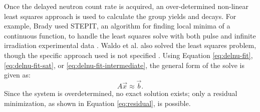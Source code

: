 



Once the delayed neutron count rate is acquired, an over-determined non-linear least squares approach is used to calculate the group yields and decays.
For example, Brady used STEPIT, an algorithm for finding local minima of a continuous function, to handle the least squares solve with both pulse and infinite irradiation experimental data \cite{brady1988evaluation, chandler1969stepit}.
Waldo et al. also solved the least squares problem, though the specific approach used is not specified \cite{waldo1981delayed}.
Using Equation \eqref{eq:delnu-fit}, \eqref{eq:delnu-fit-sat}, or \eqref{eq:delnu-fit-intermediate}, the general form of the solve is given as:
\begin{equation}
A \vec{x} \approx \vec{b}.
\label{eq:lstsq}
\end{equation}
Since the system is overdetermined, no exact solution exists; only a residual minimization, as shown in Equation \eqref{eq:residual}, is possible.


